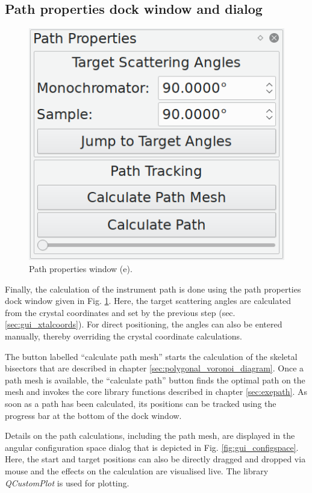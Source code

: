 \subsection{Path properties dock window and dialog}
\begin{minipage}{1 \textwidth}
\setlength{\intextsep}{0.25cm}
\begin{figure}
	\vspace{-0.25cm}
	\includegraphics[width = 0.25 \textwidth]{figures/gui_path}
	\caption[Path properties window.]{Path properties window (e).
		\label{fig:gui_path}}
\end{figure}

Finally, the calculation of the instrument path is done using the path properties dock window
given in Fig. \ref{fig:gui_path}. Here, the target scattering angles are calculated from the crystal
coordinates and set by the previous step (sec. \ref{sec:gui_xtalcoords}). For direct positioning,
the angles can also be entered manually, thereby overriding the crystal coordinate calculations.

The button labelled ``calculate path mesh'' starts the calculation of the skeletal bisectors that are
described in chapter \ref{sec:polygonal_voronoi_diagram}.
Once a path mesh is available, the ``calculate path'' button finds the optimal path on the mesh and 
invokes the core library functions described in chapter \ref{sec:exepath}.
As soon as a path has been calculated, its positions can be tracked using the progress bar at the bottom
of the dock window.

Details on the path calculations, including the path mesh, are displayed in the angular configuration
space dialog that is depicted in Fig. \ref{fig:gui_configspace}.
Here, the start and target positions can also be directly dragged and dropped via mouse and the
effects on the calculation are visualised live.
The library \textit{QCustomPlot} \cite{web_QCustomPlot} is used for plotting.

\end{minipage}



